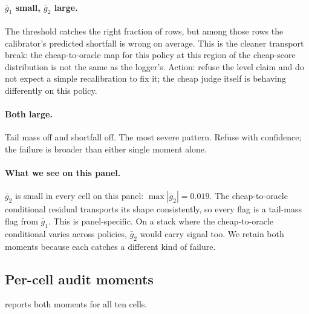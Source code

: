 \documentclass[11pt]{article}
\begin{document}
\paragraph{$\bar g_1$ small, $\bar g_2$ large.}
The threshold catches the right fraction of rows, but among those
rows the calibrator's predicted shortfall is wrong on average. This
is the cleaner transport break: the cheap-to-oracle map for this
policy at this region of the cheap-score distribution is not the
same as the logger's. Action: refuse the level claim and do not
expect a simple recalibration to fix it; the cheap judge itself is
behaving differently on this policy.

\paragraph{Both large.}
Tail mass off and shortfall off. The most severe pattern. Refuse with
confidence; the failure is broader than either single moment alone.

\paragraph{What we see on this panel.}
$\bar g_2$ is small in every cell on this panel: $\max |\bar g_2| =
0.019$. The cheap-to-oracle conditional residual transports its shape
consistently, so every flag is a tail-mass flag from $\bar g_1$. This
is panel-specific. On a stack where the cheap-to-oracle conditional
varies across policies, $\bar g_2$ would carry signal too. We retain
both moments because each catches a different kind of failure.

\subsection{Per-cell audit moments}
\label{app:moments}

 reports both moments for all ten cells.
\end{document}
